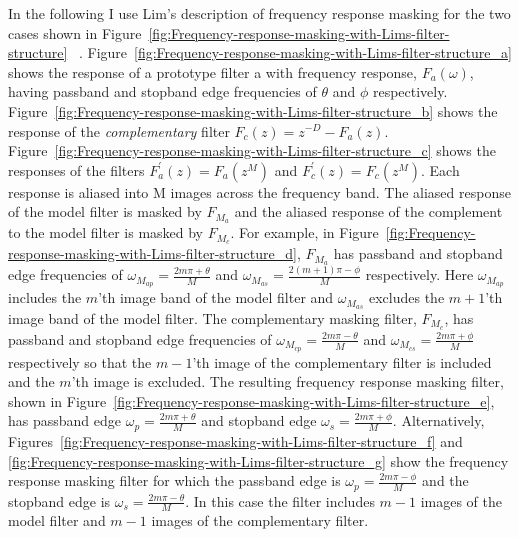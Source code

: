\documentclass[a4paper,twoside,10pt,english]{report}
\begin{document}
In the following I use Lim's description of frequency response masking for the
two cases shown in 
Figure~\ref{fig:Frequency-response-masking-with-Lims-filter-structure}~
\cite[Section III, Figure 4]{Lim_FrequencyResponseMaskingSharpDigitalFilters}.
Figure~\ref{fig:Frequency-response-masking-with-Lims-filter-structure_a} shows
the response of a prototype filter a with frequency response,
$F_{a}\left(\omega\right)$, having
passband and stopband edge frequencies of $\theta$ and $\phi$ respectively. 
Figure~\ref{fig:Frequency-response-masking-with-Lims-filter-structure_b} shows
the response of the \emph{complementary} filter 
$F_{c}\left(z\right)=z^{-D}-F_{a}\left(z\right)$. 
Figure~\ref{fig:Frequency-response-masking-with-Lims-filter-structure_c} shows
the responses of the filters 
$F_{a}^{\prime}\left(z\right)=F_{a}\left(z^{M}\right)$ and 
$F_{c}^{\prime}\left(z\right)=F_{c}\left(z^{M}\right)$. Each response is
aliased into M images across the frequency band. The aliased response of the
model filter is masked by $F_{M_{a}}$ and the aliased response of the complement
to the model filter is masked by $F_{M_{c}}$. For example, in
Figure~\ref{fig:Frequency-response-masking-with-Lims-filter-structure_d}, 
$F_{M_{a}}$ has passband and stopband edge frequencies of 
$\omega_{M_{ap}}=\frac{2m\pi+\theta}{M}$ and 
$\omega_{M_{as}}=\frac{2\left(m+1\right)\pi-\phi}{M}$ respectively. Here 
$\omega_{M_{ap}}$ includes the $m$'th image band of the model filter and 
$\omega_{M_{as}}$ excludes the $m+1$'th image band of the model filter. The 
complementary masking filter, $F_{M_{c}}$, has passband and stopband edge 
frequencies of $\omega_{M_{cp}}=\frac{2m\pi-\theta}{M}$ and 
$\omega_{M_{cs}}=\frac{2m\pi+\phi}{M}$ respectively so that the $m-1$'th
image of the complementary filter is included and the $m$'th image is excluded.
The resulting frequency response masking filter, shown in 
Figure~\ref{fig:Frequency-response-masking-with-Lims-filter-structure_e}, has 
passband edge $\omega_{p}=\frac{2m\pi+\theta}{M}$ and stopband edge 
$\omega_{s}=\frac{2m\pi+\phi}{M}$. Alternatively,  
Figures~\ref{fig:Frequency-response-masking-with-Lims-filter-structure_f} and
\ref{fig:Frequency-response-masking-with-Lims-filter-structure_g} show the
frequency response masking filter for which the passband edge is 
$\omega_{p}=\frac{2m\pi-\phi}{M}$ and the stopband edge is
$\omega_{s}=\frac{2m\pi-\theta}{M}$. In this case the filter includes $m-1$
images of the model filter and $m-1$ images of the complementary filter.
\end{document}
